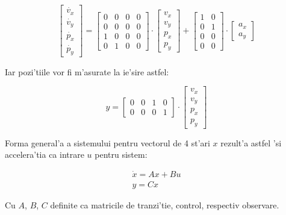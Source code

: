 \documentclass[12pt,a4paper,twoside]{report}
\begin{document}
\begin{equation}
    \begin{bmatrix} \dot{v_x} \\ \dot{v_y} \\ \dot{p_x} \\ \dot{p_y} \end{bmatrix} =  \begin{bmatrix} 0 & 0 & 0 & 0 \\ 0 & 0 & 0 & 0\\ 1 & 0 & 0 & 0 \\ 0 & 1 & 0 & 0\end{bmatrix} \cdot \begin{bmatrix} v_x \\ v_y \\ p_x \\ p_y \end{bmatrix} +  \begin{bmatrix} 1 & 0  \\0 & 1 \\ 0 & 0  \\0 & 0 \end{bmatrix} \cdot \begin{bmatrix}
    a_x \\ a_y \end{bmatrix}
\end{equation}

Iar pozi'tiile vor fi m'asurate la ie'sire astfel:


\begin{equation}
    y = \begin{bmatrix} 0 & 0 & 1 & 0 \\ 0 & 0 & 0 & 1 \end{bmatrix} \cdot \begin{bmatrix} v_x \\ v_y \\ p_x \\ p_y \end {bmatrix}
\end{equation}

Forma general'a a sistemului pentru vectorul de 4 st'ari $x$ rezult'a astfel 'si accelera'tia ca intrare $u$ pentru sistem:

\begin{gather}
    \dot x = Ax + Bu \\
    y = Cx
\end{gather}

Cu $A$, $B$, $C$ definite ca matricile de tranzi'tie, control, respectiv observare.
\end{document}
